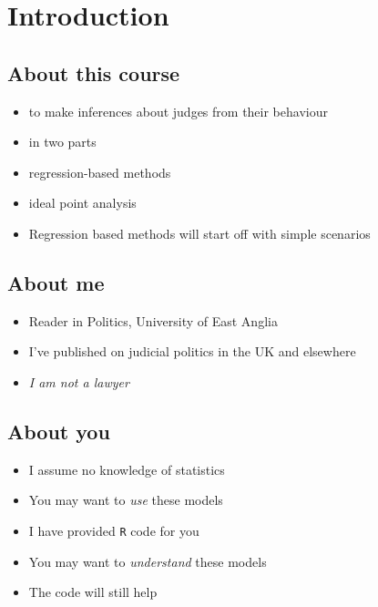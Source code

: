 \documentclass[12pt,twoside]{article}
\title{\myTitle}
\author{Chris Hanretty}
\date{6th May 2016}
\providecommand{\tightlist}{%
  \setlength{\itemsep}{0pt}\setlength{\parskip}{0pt}}
\begin{document}
\maketitle

\section{Introduction}\label{introduction}

\subsection{About this course}\label{about-this-course}

\begin{itemize}
\tightlist
\item
  to make inferences about judges from their behaviour
\item
  in two parts
\item
  regression-based methods
\item
  ideal point analysis
\item
  Regression based methods will start off with simple scenarios
\end{itemize}

\subsection{About me}\label{about-me}

\begin{itemize}
\tightlist
\item
  Reader in Politics, University of East Anglia
\item
  I've published on judicial politics in the UK and elsewhere
\item
  \emph{I am not a lawyer}
\end{itemize}

\subsection{About you}\label{about-you}

\begin{itemize}
\tightlist
\item
  I assume no knowledge of statistics
\item
  You may want to \emph{use} these models
\item
  I have provided \texttt{R} code for you
\item
  You may want to \emph{understand} these models
\item
  The code will still help
\end{itemize}
\end{document}
